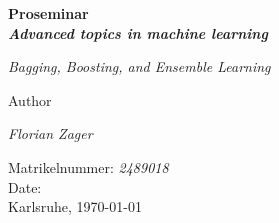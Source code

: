 \begin{titlepage}
\begin{center}
	\vspace{3em}	
    {\Huge\bfseries Proseminar \\ \textit{Advanced topics in machine learning}\par}
    \vspace{2em}
    {\huge \textit{Bagging, Boosting, and Ensemble Learning} \par}
    \vspace{3em}
    Author\\
	\vspace{1em}
    {\Large \textit{Florian Zager}\par}
    \vspace{1em}
    Matrikelnummer: \textit{2489018}\\
    \vspace{3em}
    Date:\\
	\vspace{1em}
    Karlsruhe, \today
\end{center}
\end{titlepage}